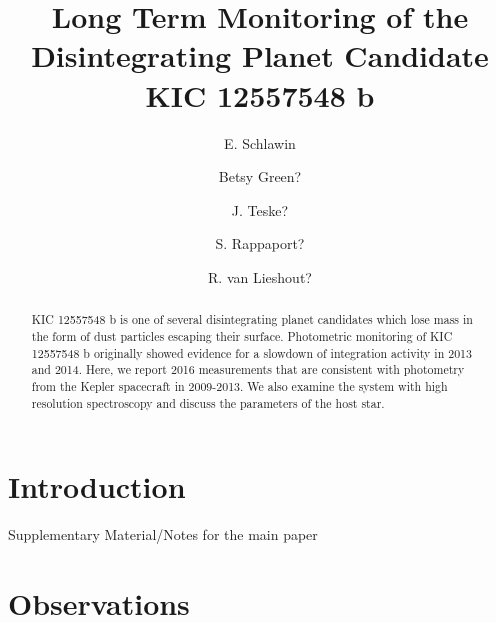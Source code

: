\documentclass[twocolumn]{aastex61}
\begin{document}
\title{Long Term Monitoring of the Disintegrating Planet Candidate KIC 12557548 b}



\author{E. Schlawin}

\author{Betsy Green?}

\author{J. Teske?}

\author{S. Rappaport?}

\author{R. van Lieshout?}

\begin{abstract}
KIC 12557548 b is one of several disintegrating planet candidates which lose mass in the form of dust particles escaping their surface. Photometric monitoring of KIC 12557548 b originally showed evidence for a slowdown of integration activity in 2013 and 2014. Here, we report 2016 measurements that are consistent with photometry from the Kepler spacecraft in 2009-2013.
We also examine the system with high resolution spectroscopy and discuss the parameters of the host star.
\end{abstract}



\section{Introduction}

Supplementary Material/Notes for the main paper

\section{Observations}
\end{document}
